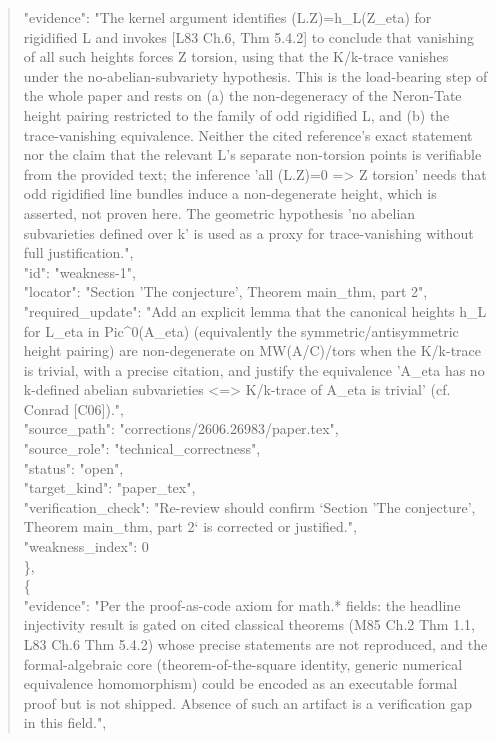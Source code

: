 \documentclass[11pt]{article}
\begin{document}
\begin{quote}
      "evidence": "The kernel argument identifies (L.Z)=h\_L(Z\_eta) for rigidified L and invokes [L83 Ch.6, Thm 5.4.2] to conclude that vanishing of all such heights forces Z torsion, using that the K/k-trace vanishes under the no-abelian-subvariety hypothesis. This is the load-bearing step of the whole paper and rests on (a) the non-degeneracy of the Neron-Tate height pairing restricted to the family of odd rigidified L, and (b) the trace-vanishing equivalence. Neither the cited reference's exact statement nor the claim that the relevant L's separate non-torsion points is verifiable from the provided text; the inference 'all (L.Z)=0 => Z torsion' needs that odd rigidified line bundles induce a non-degenerate height, which is asserted, not proven here. The geometric hypothesis 'no abelian subvarieties defined over k' is used as a proxy for trace-vanishing without full justification.",\\
      "id": "weakness-1",\\
      "locator": "Section 'The conjecture', Theorem main\_thm, part 2",\\
      "required\_update": "Add an explicit lemma that the canonical heights h\_L for L\_eta in Pic\^{}0(A\_eta) (equivalently the symmetric/antisymmetric height pairing) are non-degenerate on MW(A/C)/tors when the K/k-trace is trivial, with a precise citation, and justify the equivalence 'A\_eta has no k-defined abelian subvarieties <=> K/k-trace of A\_eta is trivial' (cf. Conrad [C06]).",\\
      "source\_path": "corrections/2606.26983/paper.tex",\\
      "source\_role": "technical\_correctness",\\
      "status": "open",\\
      "target\_kind": "paper\_tex",\\
      "verification\_check": "Re-review should confirm `Section 'The conjecture', Theorem main\_thm, part 2` is corrected or justified.",\\
      "weakness\_index": 0\\
    \},\\
    \{\\
      "evidence": "Per the proof-as-code axiom for math.* fields: the headline injectivity result is gated on cited classical theorems (M85 Ch.2 Thm 1.1, L83 Ch.6 Thm 5.4.2) whose precise statements are not reproduced, and the formal-algebraic core (theorem-of-the-square identity, generic numerical equivalence homomorphism) could be encoded as an executable formal proof but is not shipped. Absence of such an artifact is a verification gap in this field.",\\

\end{quote}
\end{document}
